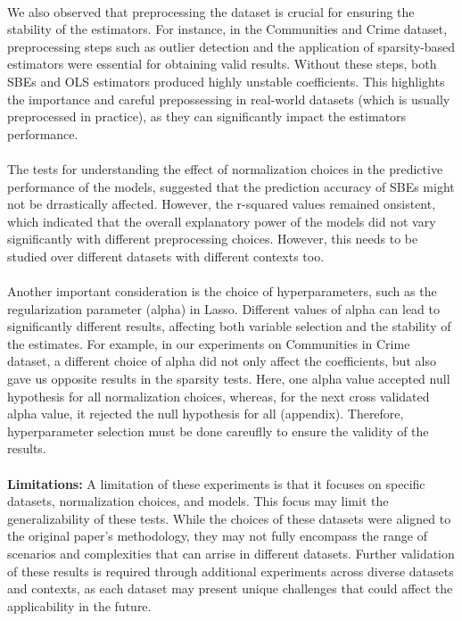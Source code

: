\\
We also observed that preprocessing the dataset is crucial for ensuring the stability of the estimators. For instance, in the Communities and Crime dataset, preprocessing steps such as outlier detection and the application of sparsity-based estimators were essential for obtaining valid results. Without these steps, both SBEs and OLS estimators produced highly unstable coefficients. This highlights the importance and careful prepossessing in real-world datasets (which is usually preprocessed in practice), as they can significantly impact the estimators performance.  \\\
\\
The tests for understanding the effect of normalization choices in the predictive performance of the models, suggested that the prediction accuracy of SBEs might not be drrastically affected. However, the r-squared values remained onsistent, which indicated that the overall explanatory power of the models did not vary significantly with different preprocessing choices. However, this needs to be studied over different datasets with different contexts too.\\
\\
Another important consideration is the choice of hyperparameters, such as the regularization parameter (alpha) in Lasso. Different values of alpha can lead to significantly different results, affecting both variable selection and the stability of the estimates. For example, in our experiments on Communities in Crime dataset, a different choice of alpha did not only affect the coefficients, but also gave us opposite results in the sparsity tests. Here, one alpha value accepted null hypothesis for all normalization choices, whereas, for the next cross validated alpha value, it rejected the null hypothesis for all (appendix). Therefore, hyperparameter selection must be done careuflly to ensure the validity of the results.\\
\\
\textbf{Limitations:} A limitation of these experiments is that it focuses on specific datasets, normalization choices, and models. This focus may limit the generalizability of these tests. While the choices of these datasets were aligned to the original paper's methodology, they may not fully encompass the range of scenarios and complexities that can arrise in different datasets. Further validation of these results is required through additional experiments across diverse datasets and contexts, as each dataset may present unique challenges that could affect the applicability in the future. \\
